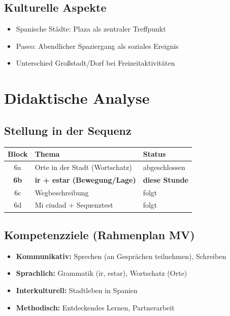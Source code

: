 \documentclass[11pt,a4paper]{article}
\begin{document}
\subsection{Kulturelle Aspekte}
\begin{itemize}
    \item Spanische Städte: Plaza als zentraler Treffpunkt
    \item Paseo: Abendlicher Spaziergang als soziales Ereignis
    \item Unterschied Großstadt/Dorf bei Freizeitaktivitäten
\end{itemize}

\section{Didaktische Analyse}

\subsection{Stellung in der Sequenz}
\begin{tabular}{|c|l|l|}
\hline
\textbf{Block} & \textbf{Thema} & \textbf{Status} \\
\hline
6a & Orte in der Stadt (Wortschatz) & abgeschlossen \\
\textbf{6b} & \textbf{ir + estar (Bewegung/Lage)} & \textbf{diese Stunde} \\
6c & Wegbeschreibung & folgt \\
6d & Mi ciudad + Sequenztest & folgt \\
\hline
\end{tabular}

\subsection{Kompetenzziele (Rahmenplan MV)}
\begin{itemize}
    \item \textbf{Kommunikativ:} Sprechen (an Gesprächen teilnehmen), Schreiben
    \item \textbf{Sprachlich:} Grammatik (ir, estar), Wortschatz (Orte)
    \item \textbf{Interkulturell:} Stadtleben in Spanien
    \item \textbf{Methodisch:} Entdeckendes Lernen, Partnerarbeit
\end{itemize}
\end{document}
